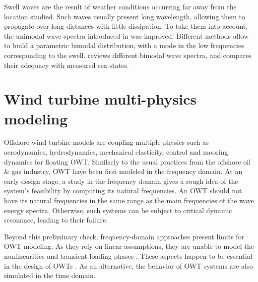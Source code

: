 Swell waves are the result of weather conditions occurring far away from the location studied. 
Such waves usually present long wavelength, allowing them to propagate over long distances with little dissipation. 
To take them into account, the unimodal wave spectra introduced in  was improved. 
Different methods allow to build a parametric bimodal distribution, with a mode in the low frequencies corresponding to the swell. 
\citet{guedes_2005_bimodal_jonswap} reviews different bimodal wave spectra, and compares their adequacy with measured sea states. 



\section{Wind turbine multi-physics modeling} \label{sec:owt_modeling}

Offshore wind turbine models are coupling multiple physics such as aerodynamics, hydrodynamics, mechanical elasticity, control and mooring dynamics for floating OWT. 
Similarly to the usual practices from the offshore oil \& gas industry, OWT have been first modeled in the frequency domain. 
At an early design stage, a study in the frequency domain gives a rough idea of the system's feasibility by computing its natural frequencies. 
An OWT should not have its natural frequencies in the same range as the main frequencies of the wave energy spectra. 
Otherwise, such systems can be subject to critical dynamic resonance, leading to their failure.

Beyond this preliminary check, frequency-domain approaches present limits for OWT modeling. 
As they rely on linear assumptions, they are unable to model the nonlinearities and transient loading phases \citep{matha_2011_ISOPE}. 
These aspects happen to be essential in the design of OWTs \citep{jonkman_2011_ISOPE}. 
As an alternative, the behavior of OWT systems are also simulated in the time domain. 

